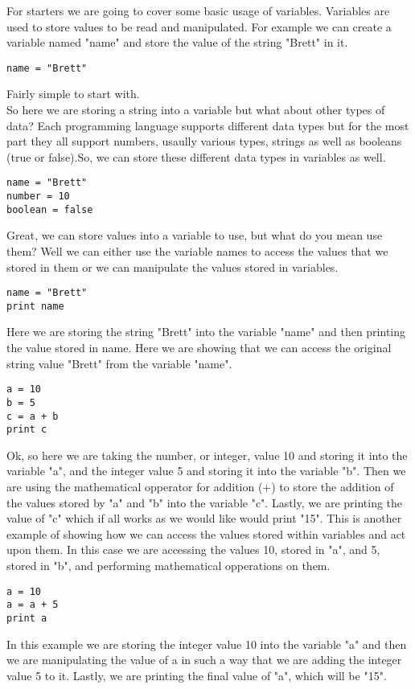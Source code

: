 For starters we are going to cover some basic usage of variables. Variables are used to store values to be read and manipulated.
For example we can create a variable named "name" and store the value of the string "Brett" in it.
\begin{lstlisting}
name = "Brett"
\end{lstlisting}

Fairly simple to start with.
\newline
\\

So here we are storing a string into a variable but what about other types of data? Each programming language supports different data types
but for the most part they all support numbers, usaully various types, strings as well as booleans (true or false).So, we can store these
different data types in variables as well.

\begin{lstlisting}
name = "Brett"
number = 10
boolean = false
\end{lstlisting}

Great, we can store values into a variable to use, but what do you mean use them? Well we can either use the variable names to access
the values that we stored in them or we can manipulate the values stored in variables.

\begin{lstlisting}
name = "Brett"
print name
\end{lstlisting}

Here we are storing the string "Brett" into the variable "name" and then printing the value stored in name. Here we are showing that
we can access the original string value "Brett" from the variable "name".

\begin{lstlisting}
a = 10
b = 5
c = a + b
print c
\end{lstlisting}

Ok, so here we are taking the number, or integer, value 10 and storing it into the variable "a", and the integer value 5 and storing it into
the variable "b". Then we are using the mathematical opperator for addition (+) to store the addition of the values stored by
"a" and "b" into the variable "c". Lastly, we are printing the value of "c" which if all works as we would like would print "15".
\newline
This is another example of showing how we can access the values stored within variables and act upon them. In this case we are accessing
the values 10, stored in "a", and 5, stored in "b", and performing mathematical opperations on them.

\begin{lstlisting}
a = 10
a = a + 5
print a
\end{lstlisting}

In this example we are storing the integer value 10 into the variable "a" and then we are manipulating the value of a in such a way that we
are adding the integer value 5 to it. Lastly, we are printing the final value of "a", which will be "15".
